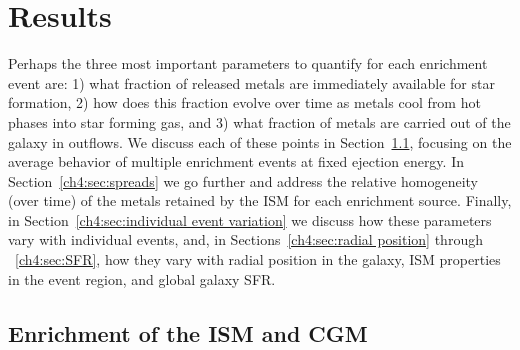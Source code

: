 \section{Results}
\label{ch4:sec:results}
Perhaps the three most important parameters to quantify for each enrichment event are: 1) what fraction of released metals are immediately available for star formation, 2) how does this fraction evolve over time as metals cool from hot phases into star forming gas, and 3) what fraction of metals are carried out of the galaxy in outflows. We discuss each of these points in Section~\ref{ch4:sec:ISM CGM}, focusing on the average behavior of multiple enrichment events at fixed ejection energy. In Section~\ref{ch4:sec:spreads} we go further and address the relative homogeneity (over time) of the metals retained by the ISM for each enrichment source. Finally, in Section~\ref{ch4:sec:individual event variation} we discuss how these parameters vary with individual events, and, in Sections~\ref{ch4:sec:radial position} through ~\ref{ch4:sec:SFR}, how they vary with radial position in the galaxy, ISM properties in the event region, and global galaxy SFR.

\subsection{Enrichment of the ISM and CGM}
\label{ch4:sec:ISM CGM}

